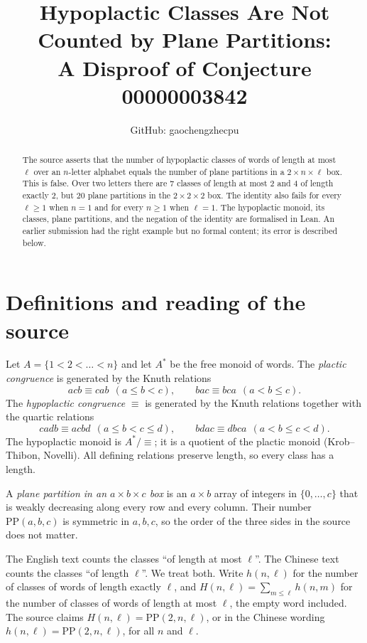 \documentclass[11pt]{article}
\title{Hypoplactic Classes Are Not Counted by Plane Partitions:\\
A Disproof of Conjecture 00000003842}
\author{GitHub: gaochengzhecpu}
\date{}
\theoremstyle{remark}
\newcommand{\hypo}{\equiv}
\begin{document}
\maketitle
\begin{abstract}
The source asserts that the number of hypoplactic classes of words of
length at most $\ell$ over an $n$-letter alphabet equals the number of
plane partitions in a $2\times n\times\ell$ box. This is false. Over two
letters there are $7$ classes of length at most $2$ and $4$ of length
exactly $2$, but $20$ plane partitions in the $2\times2\times2$ box. The
identity also fails for every $\ell\ge1$ when $n=1$ and for every
$n\ge1$ when $\ell=1$. The hypoplactic monoid, its classes, plane
partitions, and the negation of the identity are formalised in Lean. An
earlier submission had the right example but no formal content; its
error is described below.
\end{abstract}

\section*{Definitions and reading of the source}
Let $A=\{1<2<\dots<n\}$ and let $A^*$ be the free monoid of words. The
\emph{plactic congruence} is generated by the Knuth relations
\[
 acb\equiv cab\ \ (a\le b<c),\qquad bac\equiv bca\ \ (a<b\le c).
\]
The \emph{hypoplactic congruence} $\hypo$ is generated by the Knuth
relations together with the quartic relations
\[
 cadb\hypo acbd\ \ (a\le b<c\le d),\qquad
 bdac\hypo dbca\ \ (a<b\le c<d).
\]
The hypoplactic monoid is $A^*/{\hypo}$; it is a quotient of the plactic
monoid (Krob--Thibon, Novelli). All defining relations preserve length,
so every class has a length.

A \emph{plane partition in an $a\times b\times c$ box} is an $a\times b$
array of integers in $\{0,\dots,c\}$ that is weakly decreasing along
every row and every column. Their number $\mathrm{PP}(a,b,c)$ is
symmetric in $a,b,c$, so the order of the three sides in the source does
not matter.

The English text counts the classes ``of length at most $\ell$''. The
Chinese text counts the classes ``of length $\ell$''. We treat both.
Write $h(n,\ell)$ for the number of classes of words of length exactly
$\ell$, and $H(n,\ell)=\sum_{m\le\ell}h(n,m)$ for the number of classes
of words of length at most $\ell$, the empty word included. The source
claims $H(n,\ell)=\mathrm{PP}(2,n,\ell)$, or in the Chinese wording
$h(n,\ell)=\mathrm{PP}(2,n,\ell)$, for all $n$ and $\ell$.
\end{document}
